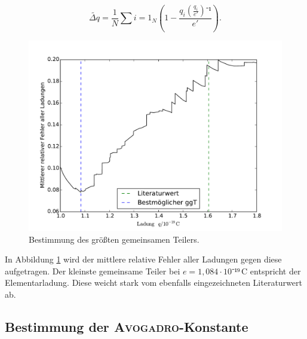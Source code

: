 \begin{equation}
\tilde{\Delta{q}}=\frac{1}{N}\sum i=1_N \left(1-\frac{q_i\left(\frac{q_i}{e'}\right)⁻¹}{e'}\right).
\end{equation}
\begin{figure}
	\centering
	\includegraphics[width=\textwidth]{Bilder/plot_ggT}
	\caption{Bestimmung des größten gemeinsamen Teilers.}
	\label{fig:2}
\end{figure}
In Abbildung \ref{fig:2} wird der mittlere relative Fehler aller Ladungen gegen diese aufgetragen. Der kleinste gemeinsame Teiler bei $e=1,084\cdot10⁻¹⁹\,\si\coulomb$ entspricht der Elementarladung. Diese weicht stark vom ebenfalls eingezeichneten Literaturwert ab. 

\subsection{Bestimmung der \textsc{Avogadro}-Konstante}

